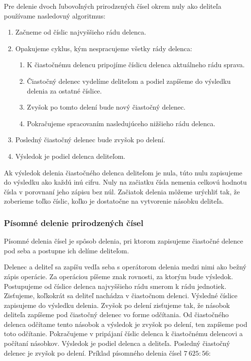 \documentclass{article}
\begin{document}
Pre delenie dvoch ľubovoľných prirodzených čísel okrem nuly ako deliteľa používame nasledovný algoritmus:
\begin{enumerate}[label=\arabic*)]
  \item Začneme od číslic najvyššieho rádu delenca.
  \item Opakujeme cyklus, kým nespracujeme všetky rády delenca:
  \begin{enumerate}
    \item K čiastočnému delencu pripojíme číslicu delenca aktuálneho rádu sprava.
    \item Čiastočný delenec vydelíme deliteľom a podiel zapíšeme do výsledku delenia za ostatné číslice.
    \item Zvyšok po tomto delení bude nový čiastočný delenec.
    \item Pokračujeme spracovaním nasledujúceho nižšieho rádu delenca.
  \end{enumerate}
  \item Posledný čiastočný delenec bude zvyšok po delení.
  \item Výsledok je podiel delenca deliteľom.
\end{enumerate}
Ak výsledok delenia čiastočného delenca deliteľom je nula, túto nulu zapisujeme do výsledku ako každú inú cifru. Nuly na začiatku čísla nemenia celkovú hodnotu čísla v porovnaní jeho zápisu bez núl. Začiatok delenia môžeme urýchliť tak, že zoberieme toľko číslic, koľko je dostatočne na vytvorenie násobku deliteľa. 

\subsubsection{Písomné delenie prirodzených čísel}

Písomné delenia čísel je spôsob delenia, pri ktorom zapisujeme čiastočné delence pod seba a postupne ich delíme deliteľom.

Delenec a deliteľ sa zapíšu vedľa seba s operátorom delenia medzi nimi ako bežný zápis operácie. Za operáciou píšeme znak rovnosti, za ktorým bude výsledok. Postupujeme od číslice delenca najvyššieho rádu smerom k rádu jednotiek. Zisťujeme, koľkokrát sa deliteľ nachádza v čiastočnom delenci. Výsledné číslice zapisujeme do výsledku delenia. Zvyšok po delení zisťujeme tak, že násobok deliteľa zapíšeme pod čiastočný delenec vo forme odčítania. Od čiastočného delenca odčítame tento násobok a výsledok je zvyšok po delení, ten zapíšeme pod toto odčítanie. Pokračujeme v pripájaní číslic delenca k čiastočnému delencovi a počítaní násobkov. Výsledok je podiel delenca a deliteľa. Posledný čiastočný delenec je zvyšok po delení.
Príklad písomného delenia čísel \(7\ 625 : 56\):
\end{document}
